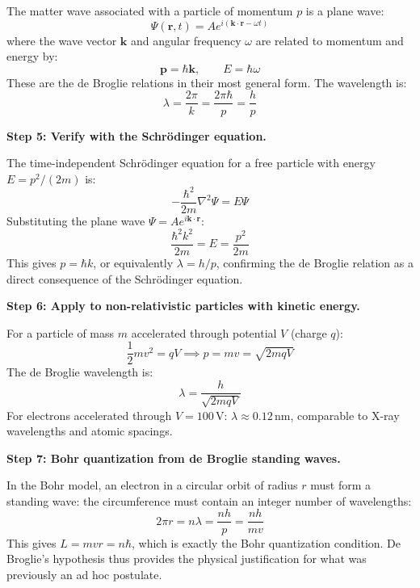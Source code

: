 \documentclass[11pt,openright]{book}
\begin{document}
The matter wave associated with a particle of momentum $p$ is a plane wave:
\begin{equation}
\Psi(\mathbf{r},t) = Ae^{i(\mathbf{k}\cdot\mathbf{r} - \omega t)}
\end{equation}
where the wave vector $\mathbf{k}$ and angular frequency $\omega$ are related to momentum and energy by:
\begin{equation}
\mathbf{p} = \hbar\mathbf{k}, \qquad E = \hbar\omega
\end{equation}
These are the de Broglie relations in their most general form. The wavelength is:
\begin{equation}
\lambda = \frac{2\pi}{k} = \frac{2\pi\hbar}{p} = \frac{h}{p}
\end{equation}

\textbf{Step 5: Verify with the Schrödinger equation.}

The time-independent Schrödinger equation for a free particle with energy $E = p^2/(2m)$ is:
\begin{equation}
-\frac{\hbar^2}{2m}\nabla^2\Psi = E\Psi
\end{equation}
Substituting the plane wave $\Psi = Ae^{i\mathbf{k}\cdot\mathbf{r}}$:
\begin{equation}
\frac{\hbar^2 k^2}{2m} = E = \frac{p^2}{2m}
\end{equation}
This gives $p = \hbar k$, or equivalently $\lambda = h/p$, confirming the de Broglie relation as a direct consequence of the Schrödinger equation.

\textbf{Step 6: Apply to non-relativistic particles with kinetic energy.}

For a particle of mass $m$ accelerated through potential $V$ (charge $q$):
\begin{equation}
\frac{1}{2}mv^2 = qV \implies p = mv = \sqrt{2mqV}
\end{equation}
The de Broglie wavelength is:
\begin{equation}
\lambda = \frac{h}{\sqrt{2mqV}}
\end{equation}
For electrons accelerated through $V = 100\,\text{V}$: $\lambda \approx 0.12\,\text{nm}$, comparable to X-ray wavelengths and atomic spacings.

\textbf{Step 7: Bohr quantization from de Broglie standing waves.}

In the Bohr model, an electron in a circular orbit of radius $r$ must form a standing wave: the circumference must contain an integer number of wavelengths:
\begin{equation}
2\pi r = n\lambda = \frac{nh}{p} = \frac{nh}{mv}
\end{equation}
This gives $L = mvr = n\hbar$, which is exactly the Bohr quantization condition. De Broglie's hypothesis thus provides the physical justification for what was previously an ad hoc postulate.
\end{document}
